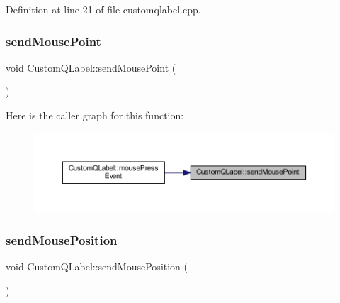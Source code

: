 Definition at line 21 of file customqlabel.\+cpp.

\mbox{\label{class_custom_q_label_a7d4eb54a2a007c20a19dd5f7fac50af4}} 
\subsubsection{\texorpdfstring{sendMousePoint}{sendMousePoint}}
{\footnotesize\ttfamily void Custom\+Q\+Label\+::send\+Mouse\+Point (\begin{DoxyParamCaption}\item[{Q\+Point \&}]{ }\end{DoxyParamCaption})\hspace{0.3cm}{\ttfamily [signal]}}

Here is the caller graph for this function\+:\nopagebreak
\begin{figure}[H]
\begin{center}
\leavevmode
\includegraphics[width=350pt]{class_custom_q_label_a7d4eb54a2a007c20a19dd5f7fac50af4_icgraph}
\end{center}
\end{figure}
\mbox{\label{class_custom_q_label_ac07a9c61c0ac4df046b70cbec46e1af5}} 
\subsubsection{\texorpdfstring{sendMousePosition}{sendMousePosition}}
{\footnotesize\ttfamily void Custom\+Q\+Label\+::send\+Mouse\+Position (\begin{DoxyParamCaption}\item[{Q\+Point \&}]{ }\end{DoxyParamCaption})\hspace{0.3cm}{\ttfamily [signal]}}

